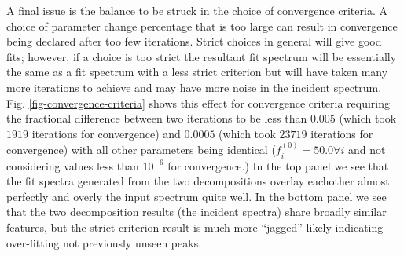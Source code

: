 \documentclass[5p]{elsarticle}
\begin{document}
A final issue is the balance to be struck in the choice of convergence criteria. A choice of parameter change percentage that is too large can result in convergence being declared after too few iterations. Strict choices in general will give good fits; however, if a choice is too strict the resultant fit spectrum will be essentially the same as a fit spectrum with a less strict criterion but will have taken many more iterations to achieve and may have more noise in the incident spectrum. Fig. \ref{fig-convergence-criteria} shows this effect for convergence criteria requiring the fractional difference between two iterations to be less than $0.005$ (which took $1919$ iterations for convergence) and $0.0005$ (which took $23719$ iterations for convergence) with all other parameters being identical ($f^{(0)}_i = 50.0 \forall i$ and not considering values less than $10^{-6}$ for convergence.) In the top panel we see that the fit spectra generated from the two decompositions overlay eachother almost perfectly and overly the input spectrum quite well. In the bottom panel we see that the two decomposition results (the incident spectra) share broadly similar features, but the strict criterion result is much more ``jagged'' likely indicating over-fitting not previously unseen peaks.
\end{document}

